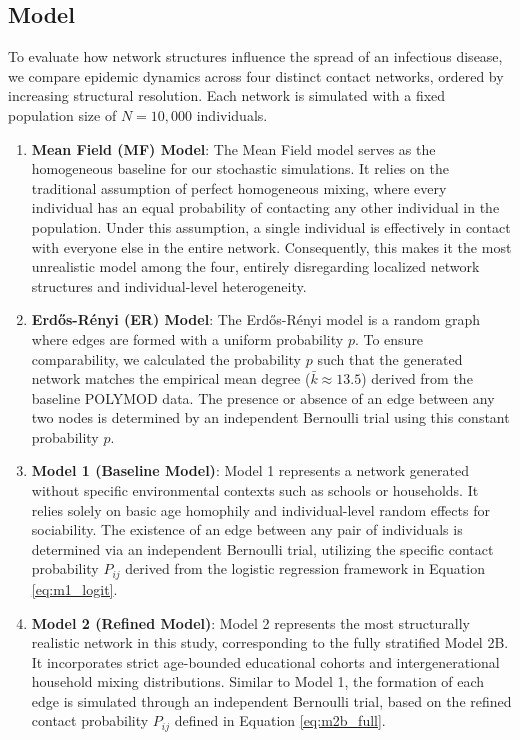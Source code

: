\subsection{Model}
\label{sec:epidemic_model}

To evaluate how network structures influence the spread of an infectious disease, we compare epidemic dynamics across four distinct contact networks, ordered by increasing structural resolution.
Each network is simulated with a fixed population size of $N = 10,000$ individuals.

\begin{enumerate}
    \item \textbf{Mean Field (MF) Model}:
    The Mean Field model serves as the homogeneous baseline for our stochastic simulations.
    It relies on the traditional assumption of perfect homogeneous mixing, where every individual has an equal probability of contacting any other individual in the population.
    Under this assumption, a single individual is effectively in contact with everyone else in the entire network.
    Consequently, this makes it the most unrealistic model among the four, entirely disregarding localized network structures and individual-level heterogeneity.

    \item \textbf{Erd\H{o}s-R\'enyi (ER) Model}:
    The Erd\H{o}s-R\'enyi model is a random graph where edges are formed with a uniform probability $p$.
    To ensure comparability, we calculated the probability $p$ such that the generated network matches the empirical mean degree ($\bar{k} \approx 13.5$) derived from the baseline POLYMOD data.
    The presence or absence of an edge between any two nodes is determined by an independent Bernoulli trial using this constant probability $p$.

    \item \textbf{Model 1 (Baseline Model)}:
    Model 1 represents a network generated without specific environmental contexts such as schools or households.
    It relies solely on basic age homophily and individual-level random effects for sociability.
    The existence of an edge between any pair of individuals is determined via an independent Bernoulli trial, utilizing the specific contact probability $P_{ij}$ derived from the logistic regression framework in Equation \ref{eq:m1_logit}.

    \item \textbf{Model 2 (Refined Model)}:
    Model 2 represents the most structurally realistic network in this study, corresponding to the fully stratified Model 2B.
    It incorporates strict age-bounded educational cohorts and intergenerational household mixing distributions.
    Similar to Model 1, the formation of each edge is simulated through an independent Bernoulli trial, based on the refined contact probability $P_{ij}$ defined in Equation \ref{eq:m2b_full}.
\end{enumerate}
